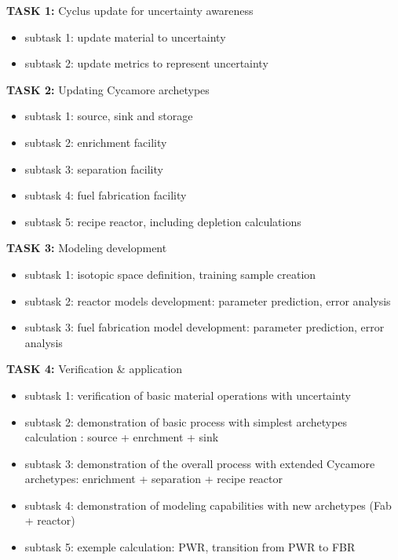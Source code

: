 \documentclass[dvips,11pt]{article}
\begin{document}
\newpage
\noindent\textbf{TASK 1:} Cyclus update for uncertainty awareness
\begin{itemize}[nosep]
\item subtask 1: update material to uncertainty
\item subtask 2: update metrics to represent uncertainty
\end{itemize}

\noindent\textbf{TASK 2:} Updating Cycamore archetypes
\begin{itemize}[nosep]
\item subtask 1: source, sink and storage
\item subtask 2: enrichment facility 
\item subtask 3: separation facility
\item subtask 4: fuel fabrication facility
\item subtask 5: recipe reactor, including depletion calculations
\end{itemize}

\noindent\textbf{TASK 3:} Modeling development
\begin{itemize}[nosep]
\item subtask 1: isotopic space definition,
  training sample creation
\item subtask 2: reactor models development:
  parameter prediction, error analysis
\item subtask 3: fuel fabrication model
  development: parameter prediction, error
  analysis
\end{itemize}
 
\noindent\textbf{TASK 4:} Verification \& application
\begin{itemize}[nosep]
\item subtask 1: verification of basic material
  operations with uncertainty
\item subtask 2: demonstration of basic process
  with simplest archetypes calculation : source +
  enrchment + sink
\item subtask 3: demonstration of the overall
  process with extended Cycamore archetypes:
  enrichment + separation + recipe reactor
\item subtask 4: demonstration of modeling
  capabilities with new archetypes (Fab + reactor)
\item subtask 5: exemple calculation: PWR,
  transition from PWR to FBR
\end{itemize}
\end{document}
